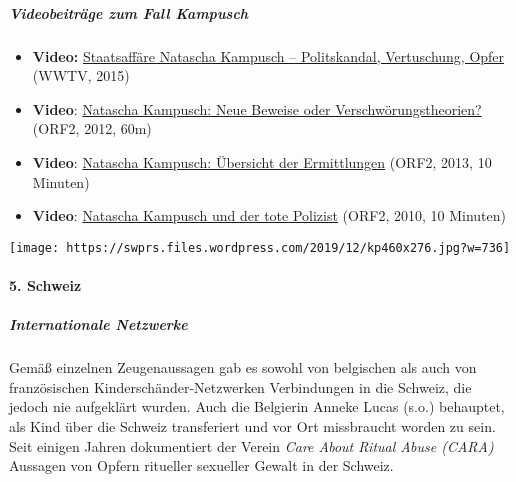 \hypertarget{videobeitruxe4ge-zum-fall-kampusch}{%
\subparagraph{\texorpdfstring{\textbf{Videobeiträge zum Fall
Kampusch}}{Videobeiträge zum Fall Kampusch}}\label{videobeitruxe4ge-zum-fall-kampusch}}

\begin{itemize}
\tightlist
\item
  \textbf{Video:}
  \href{https://www.youtube.com/watch?v=wtOBAZgUJjU}{Staatsaffäre
  Natascha Kampusch -- Politskandal, Vertuschung, Opfer} (WWTV, 2015)
\item
  \textbf{Video}:
  \href{https://www.youtube.com/watch?v=MmJDNjp3eDA}{Natascha Kampusch:
  Neue Beweise oder Verschwörungstheorien?} (ORF2, 2012, 60m)
\item
  \textbf{Video}:
  \href{https://www.youtube.com/watch?v=ZBDpYEmXUhs}{Natascha Kampusch:
  Übersicht der Ermittlungen} (ORF2, 2013, 10 Minuten)
\item
  \textbf{Video}:
  \href{https://www.youtube.com/watch?v=4fOsYnKTAYw}{Natascha Kampusch
  und der tote Polizist} (ORF2, 2010, 10 Minuten)
\end{itemize}

\texttt{[image: https://swprs.files.wordpress.com/2019/12/kp460x276.jpg?w=736]}

\hypertarget{5-schweiz}{%
\paragraph{5. Schweiz}\label{5-schweiz}}

\hypertarget{internationale-netzwerke}{%
\subparagraph{\texorpdfstring{\textbf{Internationale
Netzwerke}}{Internationale Netzwerke}}\label{internationale-netzwerke}}

Gemäß einzelnen Zeugenaussagen gab es sowohl von belgischen als auch von
französischen Kinder­schänder-Netzwerken Verbindungen in die Schweiz,
die jedoch nie aufgeklärt wurden. Auch die Belgierin Anneke Lucas (s.o.)
behauptet, als Kind über die Schweiz transferiert und vor Ort
missbraucht worden zu sein. Seit einigen Jahren dokumentiert der Verein
\emph{Care About Ritual Abuse (CARA)} Aussagen von Opfern ritueller
sexueller Gewalt in der Schweiz.


